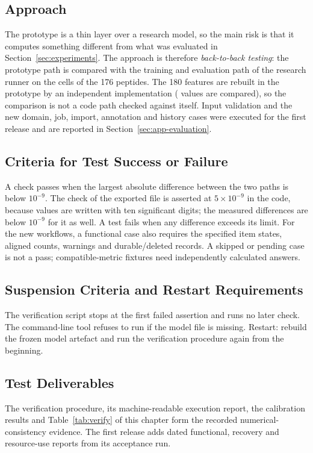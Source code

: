 \subsection{Approach}
The prototype is a thin layer over a research model, so the main risk is that it computes something different from what was
evaluated in Section~\ref{sec:experiments}. The approach is therefore \emph{back-to-back testing}: the prototype path is compared with the
training and evaluation path of the research runner on the \nVerCells{} cells of the 176 peptides. The 180 features are rebuilt in the
prototype by an independent implementation (\nVerFeatures{} values are compared), so the comparison is not a code path checked against itself.
Input validation and the new domain, job, import, annotation and history cases were executed for
the first release and are reported in Section~\ref{sec:app-evaluation}.
\subsection{Criteria for Test Success or Failure}
A check passes when the largest absolute difference between the two paths is below $10^{-9}$. The check of the exported file is asserted at
$5\times10^{-9}$ in the code, because values are written with ten significant digits; the measured differences are below $10^{-9}$ for it as well.
A test fails when any difference exceeds its limit. For the new workflows, a functional case also
requires the specified item states, aligned counts, warnings and durable/deleted records. A skipped
or pending case is not a pass; compatible-metric fixtures need independently calculated answers.
\subsection{Suspension Criteria and Restart Requirements}
The verification script stops at the first failed assertion and runs no later check. The command-line tool refuses to run if the model file is missing.
Restart: rebuild the frozen model artefact and run the verification procedure again from the beginning.
\subsection{Test Deliverables}
The verification procedure, its machine-readable execution report, the calibration results and
Table~\ref{tab:verify} of this chapter form the recorded numerical-consistency evidence. The first
release adds dated functional, recovery and resource-use reports from its acceptance run.

